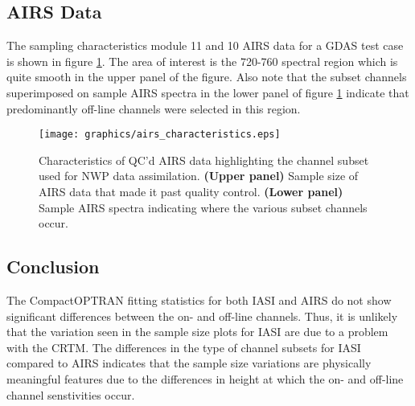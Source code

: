 \subsection{AIRS Data}
The sampling characteristics module 11 and 10 AIRS data for a GDAS test case is shown in figure \ref{fig:airs_characteristics}. The area of interest is the 720-760\invcm{} spectral region which is quite smooth in the upper panel of the figure. Also note that the subset channels superimposed on sample AIRS spectra in the lower panel of figure \ref{fig:airs_characteristics} indicate that predominantly off-line channels were selected in this region.
\begin{figure}[htp]
  \centering
  \texttt{[image: graphics/airs\_characteristics.eps]}
  \caption{Characteristics of QC'd AIRS data highlighting the channel subset used for NWP data assimilation. \textbf{(Upper panel)} Sample size of AIRS data that made it past quality control. \textbf{(Lower panel)} Sample AIRS spectra indicating where the various subset channels occur.}
  \label{fig:airs_characteristics}
\end{figure}


\subsection{Conclusion}
The CompactOPTRAN fitting statistics for both IASI and AIRS do not show significant differences between the on- and off-line channels. Thus, it is unlikely that the variation seen in the sample size plots for IASI are due to a problem with the CRTM. The differences in the type of channel subsets for IASI compared to AIRS indicates that the sample size variations are physically meaningful features due to the differences in height at which the on- and off-line channel senstivities occur.

